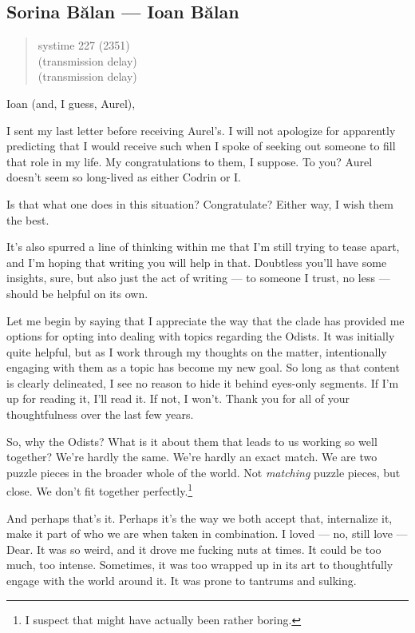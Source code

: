 \hypertarget{sorina-bux103lan-ioan-bux103lan}{%
\subsection{Sorina Bălan — Ioan Bălan}\label{sorina-bux103lan-ioan-bux103lan}}

\begin{quote}
systime 227 (2351)\\
(transmission delay)\\
(transmission delay)
\end{quote}

Ioan (and, I guess, Aurel),

I sent my last letter before receiving Aurel's. I will not apologize for apparently predicting that I would receive such when I spoke of seeking out someone to fill that role in my life. My congratulations to them, I suppose. To you? Aurel doesn't seem so long-lived as either Codrin or I.

Is that what one does in this situation? Congratulate? Either way, I wish them the best.

It's also spurred a line of thinking within me that I'm still trying to tease apart, and I'm hoping that writing you will help in that. Doubtless you'll have some insights, sure, but also just the act of writing — to someone I trust, no less — should be helpful on its own.

Let me begin by saying that I appreciate the way that the clade has provided me options for opting into dealing with topics regarding the Odists. It was initially quite helpful, but as I work through my thoughts on the matter, intentionally engaging with them as a topic has become my new goal. So long as that content is clearly delineated, I see no reason to hide it behind eyes-only segments. If I'm up for reading it, I'll read it. If not, I won't. Thank you for all of your thoughtfulness over the last few years.

So, why the Odists? What is it about them that leads to us working so well together? We're hardly the same. We're hardly an exact match. We are two puzzle pieces in the broader whole of the world. Not \emph{matching} puzzle pieces, but close. We don't fit together perfectly.\footnote{I suspect that might have actually been rather boring.}

And perhaps that's it. Perhaps it's the way we both accept that, internalize it, make it part of who we are when taken in combination. I loved — no, still love — Dear. It was so weird, and it drove me fucking nuts at times. It could be too much, too intense. Sometimes, it was too wrapped up in its art to thoughtfully engage with the world around it. It was prone to tantrums and sulking.

